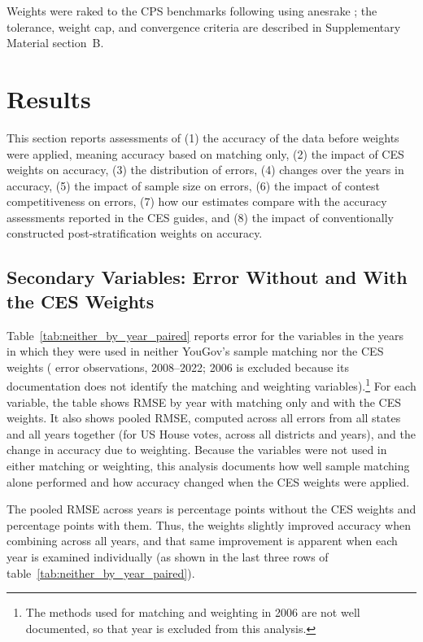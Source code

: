 \documentclass[12pt]{article}
\begin{document}


Weights were raked to the CPS benchmarks following \textcite{debell_computing_2009} using anesrake \parencite{pasek_anesrake_2018}; the tolerance, weight cap, and convergence criteria are described in Supplementary Material section~B.

\section{Results}\label{sec:results}
This section reports assessments of (1) the accuracy of the data before weights were applied, meaning accuracy based on matching only, (2) the impact of CES weights on accuracy, (3) the distribution of errors, (4) changes over the years in accuracy, (5) the impact of sample size on errors, (6) the impact of contest competitiveness on errors, (7) how our estimates compare with the accuracy assessments reported in the CES guides, and (8) the impact of conventionally constructed post-stratification weights on accuracy.

\subsection{Secondary Variables: Error Without and With the CES Weights}

Table~\ref{tab:neither_by_year_paired} reports error for the \NeitherNVars{} variables in the years in which they were used in neither YouGov's sample matching nor the CES weights (\NeitherNObs{} error observations, 2008--2022; 2006 is excluded because its documentation does not identify the matching and weighting variables).\footnote{The methods used for matching and weighting in 2006 are not well documented, so that year is excluded from this analysis.} For each variable, the table shows RMSE by year with matching only and with the CES weights. It also shows pooled RMSE, computed across all errors from all states and all years together (for US House votes, across all districts and years), and the change in accuracy due to weighting. Because the variables were not used in either matching or weighting, this analysis documents how well sample matching alone performed and how accuracy changed when the CES weights were applied.

The pooled RMSE across years is \NeitherMeanBefore{} percentage points without the CES weights and \NeitherMeanAfter{} percentage points with them. Thus, the weights slightly improved accuracy when combining across all years, and that same improvement is apparent when each year is examined individually (as shown in the last three rows of table~\ref{tab:neither_by_year_paired}).
\end{document}

